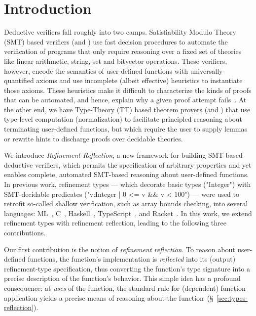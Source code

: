 \section{Introduction}\label{sec:intro}

Deductive verifiers fall roughly
into two camps.
%
Satisfiability Modulo Theory (SMT)
based verifiers (\eg \dafny and \fstar)
use fast decision procedures to
automate the verification of programs that
only require reasoning over a fixed
set of theories like linear arithmetic,
string, set and bitvector operations.
%
These verifiers, however, encode the
semantics of user-defined functions
with universally-quantified axioms
and use incomplete (albeit effective)
heuristics to instantiate those axioms.
%
These heuristics make it difficult to
characterize the kinds of proofs that
can be automated, and hence,
explain why a given proof attempt
fails~\cite{Leino16}.
%
At the other end, we have
Type-Theory (TT) based theorem provers
(\eg \coq and \agda)
that use type-level computation
(normalization) to facilitate
principled reasoning about
terminating user-defined functions,
but which
require the user to supply
lemmas or rewrite hints
to discharge proofs
over decidable theories.


We introduce \emph{Refinement Reflection},
a new framework for building SMT-based
deductive verifiers, which permits the
specification of arbitrary properties
and yet enables complete, automated
SMT-based reasoning about user-defined
functions.
%
In previous work, refinement types
\citep{ConstableS87,Rushby98} --- which decorate
basic types (\eg "Integer") with SMT-decidable
predicates (\eg "{v:Integer | 0 <= v && v < 100}") --- were
used to retrofit so-called shallow
verification, such as array bounds checking, into
several languages:
%
ML~\cite{pfenningxi98,GordonRefinement09,LiquidPLDI08},
C~\cite{deputy,LiquidPOPL10},
Haskell~\citep{Vazou14},
TypeScript~\cite{Vekris16}, and
Racket~\cite{RefinedRacket}.
%
In this work, 
we extend refinement types with refinement reflection,
leading to the following three contributions.

%
Our first contribution is the notion of
\emph{refinement reflection}.
%
To reason about user-defined functions,
the function's implementation is
\emph{reflected} into its (output)
refinement-type specification,
thus converting the function's
type signature into a precise
description of the function's behavior.
%
This simple idea has a profound consequence:
at \emph{uses} of the function, the standard
rule for (dependent) function application
yields a precise means of reasoning about
the function~(\S~\ref{sec:types-reflection}).


